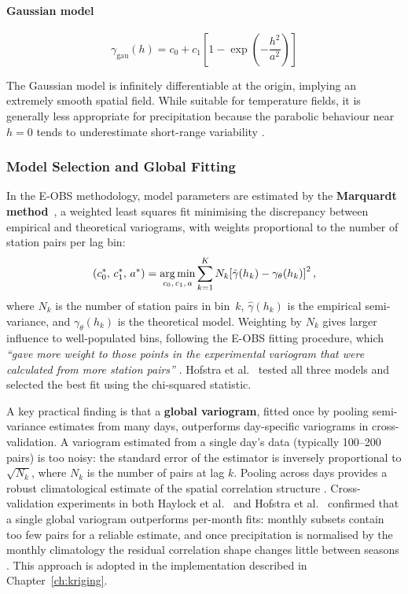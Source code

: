 \paragraph{Gaussian model}

\begin{equation}
    \gamma_{\text{gau}}(h) = c_0 + c_1 \left[1 - \exp\!\left(-\frac{h^2}{a^2}\right)\right]
    \label{eq:gaussian}
\end{equation}

The Gaussian model is infinitely differentiable at the origin, implying
an extremely smooth spatial field.
While suitable for temperature fields, it is generally less appropriate for
precipitation because the parabolic behaviour near $h = 0$ tends to
underestimate short-range variability \cite{cressie1993}.

\subsubsection{Model Selection and Global Fitting}

In the E-OBS methodology, model parameters are estimated by the
\textbf{Marquardt method}~\cite{haylock2008european}, a weighted least squares
fit minimising the discrepancy between empirical and theoretical
variograms, with weights proportional to the number of station pairs per
lag bin:
\begin{equation}
  (c_0^*,\, c_1^*,\, a^*)
  = \operatorname*{arg\,min}_{c_0,\, c_1,\, a}
    \sum_{k=1}^{K}
    N_k \!\left[\hat{\gamma}(h_k) - \gamma_{\theta}(h_k)\right]^{2},
  \label{eq:marquardt-variogram}
\end{equation}
where $N_k$ is the number of station pairs in bin~$k$, $\hat{\gamma}(h_k)$ is the
empirical semi-variance, and $\gamma_{\theta}(h_k)$ is the theoretical model.
Weighting by $N_k$ gives larger influence to well-populated bins, following the
E-OBS fitting procedure, which \textit{``gave more weight to those points in the
experimental variogram that were calculated from more station pairs''}
\cite[p.~5]{haylock2008european}.
Hofstra et al.~\cite{hofstra2008comparison} tested all three models and selected the best
fit using the chi-squared statistic.

A key practical finding is that a \textbf{global variogram}, fitted once by
pooling semi-variance estimates from many days, outperforms day-specific
variograms in cross-validation.
A variogram estimated from a single day's data (typically 100--200 pairs) is too
noisy: the standard error of the estimator is inversely proportional to
$\sqrt{N_k}$, where $N_k$ is the number of pairs at lag $k$.
Pooling across days provides a robust climatological
estimate of the spatial correlation structure
\cite{hofstra2008comparison, haylock2008european}.
Cross-validation experiments in both Haylock et al.~\cite{haylock2008european}
and Hofstra et al.~\cite{hofstra2008comparison} confirmed that a single global
variogram outperforms per-month fits: monthly subsets contain too few pairs for
a reliable estimate, and once precipitation is normalised by the monthly
climatology the residual correlation shape changes little between
seasons \cite{haylock2008european}.
This approach is adopted in the implementation described in
Chapter~\ref{ch:kriging}.


